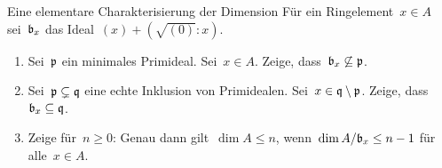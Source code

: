 \documentclass{uebblatt}
\begin{document}

\begin{aufgabe}{}{Eine elementare Charakterisierung der Dimension}
Für ein Ringelement~$x \in A$ sei~$\mathfrak{b}_x$ das Ideal~$(x) + (\sqrt{(0)}:x)$.
\begin{enumerate}
\item Sei~$\mathfrak{p}$ ein minimales Primideal. Sei~$x \in A$. Zeige,
dass~$\mathfrak{b}_x \not\subseteq \mathfrak{p}$.
\item Sei~$\mathfrak{p} \subsetneq \mathfrak{q}$ eine echte Inklusion von Primidealen. Sei~$x
\in \mathfrak{q} \setminus \mathfrak{p}$. Zeige, dass~$\mathfrak{b}_x \subseteq \mathfrak{q}$.
\item Zeige für~$n \geq 0$: Genau dann gilt~$\dim A \leq n$, wenn~$\dim
A/\mathfrak{b}_x \leq n - 1$ für alle~$x \in A$.
\end{enumerate}
\end{aufgabe}
\end{document}
